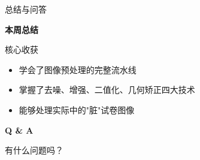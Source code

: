 
\begin{frame}{总结与问答}
    \begin{center}
        \Huge \textbf{本周总结}
        \vspace{0.8cm}

        \begin{block}{核心收获}
            \begin{itemize}
                \item 学会了图像预处理的完整流水线
                \item 掌握了去噪、增强、二值化、几何矫正四大技术
                \item 能够处理实际中的"脏"试卷图像
            \end{itemize}
        \end{block}

        \vspace{0.8cm}
        \Huge \textbf{Q \& A}
        \vspace{0.5cm}

        \Large 有什么问题吗？
    \end{center}
\end{frame}
